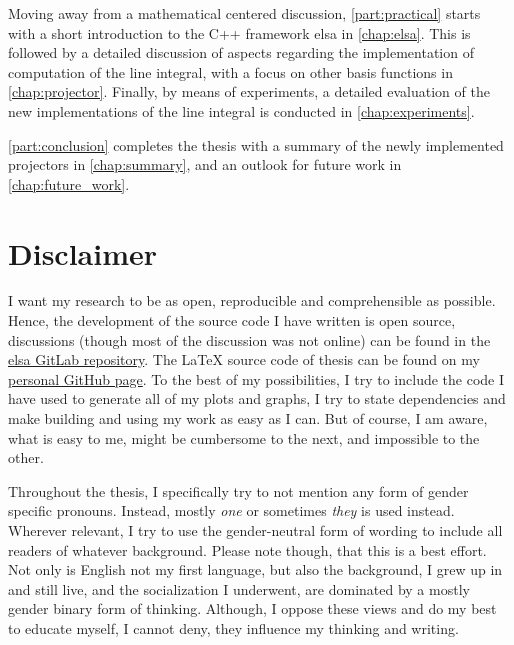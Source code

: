 Moving away from a mathematical centered discussion, \autoref{part:practical} starts with a short
introduction to the C++ framework elsa in \autoref{chap:elsa}. This is followed by a detailed
discussion of aspects regarding the implementation of computation of the line integral, with a focus
on other basis functions in \autoref{chap:projector}. Finally, by means of experiments, a detailed
evaluation of the new implementations of the line integral is conducted in
\autoref{chap:experiments}.

\autoref{part:conclusion} completes the thesis with a summary of the newly implemented projectors in
\autoref{chap:summary}, and an outlook for future work in \autoref{chap:future_work}.

\section{Disclaimer}\label{sec:disclaimer}

I want my research to be as open, reproducible and comprehensible as possible. Hence, the
development of the source code I have written is open source, discussions (though most of the
discussion was not online) can be found in the \href{https://gitlab.lrz.de/IP/elsa}{elsa GitLab
	repository}. The \LaTeX{} source code of thesis can be found on my
\href{https://github.com/ner0-m/ma-thesis-differential-basis-for-ct}{personal GitHub page}. To the
best of my possibilities, I try to include the code I have used to generate all of my plots and
graphs, I try to state dependencies and make building and using my work as easy as I can. But of
course, I am aware, what is easy to me, might be cumbersome to the next, and impossible to the
other.

Throughout the thesis, I specifically try to not mention any form of gender specific pronouns.
Instead, mostly \textit{one} or sometimes \textit{they} is used instead. Wherever relevant, I try to
use the gender-neutral form of wording to include all readers of whatever background. Please note
though, that this is a best effort. Not only is English not my first language, but also the
background, I grew up in and still live, and the socialization I underwent, are dominated by a
mostly gender binary form of thinking. Although, I oppose these views and do my best to educate
myself, I cannot deny, they influence my thinking and writing.
